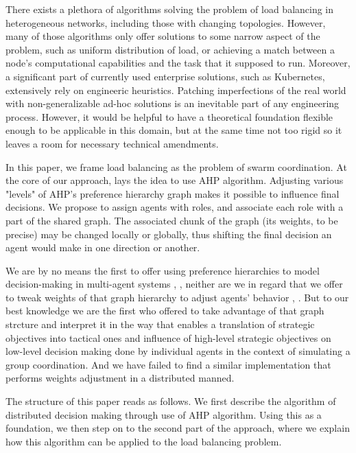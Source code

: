 
There exists a plethora of algorithms solving the problem of load balancing in heterogeneous networks, including those with changing topologies.
However, many of those algorithms only offer solutions to some narrow aspect of the problem, such as uniform distribution of load, or achieving a match between a node's computational capabilities and the task that it supposed to run.
Moreover, a significant part of currently used enterprise solutions, such as Kubernetes, extensively rely on engineeric heuristics.
Patching imperfections of the real world with non-generalizable ad-hoc solutions is an inevitable part of any engineering process.
However, it would be helpful to have a theoretical foundation flexible enough to be applicable in this domain, but at the same time not too rigid so it leaves a room for necessary technical amendments.

In this paper, we frame load balancing as the problem of swarm coordination.
At the core of our approach, lays the idea to use AHP algorithm.
Adjusting various "levels" of AHP's preference hierarchy graph makes it possible to influence final decisions.
We propose to assign agents with roles, and associate each role with a part of the shared graph.
The associated chunk of the graph (its weights, to be precise) may be changed locally or globally, thus shifting the final decision an agent would make in one direction or another.


We are by no means the first to offer using preference hierarchies to model decision-making in multi-agent systems \cite{cartvehishvili-2018-model}, \cite{drakaki-2018-intelligent}, neither are we in regard that we offer to tweak weights of that graph hierarchy to adjust agents' behavior \cite{zytniewski-2016-application}, \cite{brintrup-2010-behaviour}.
But to our best knowledge we are the first who offered to take advantage of that graph strcture and interpret it in the way that enables a translation of strategic objectives into tactical ones and influence of high-level strategic objectives on low-level decision making done by individual agents in the context of simulating a group coordination.
And we have failed to find a similar implementation that performs weights adjustment in a distributed manned.

The structure of this paper reads as follows. We first describe the algorithm of distributed decision making through use of AHP algorithm.
Using this as a foundation, we then step on to the second part of the approach, where we explain how this algorithm can be applied to the load balancing problem.

